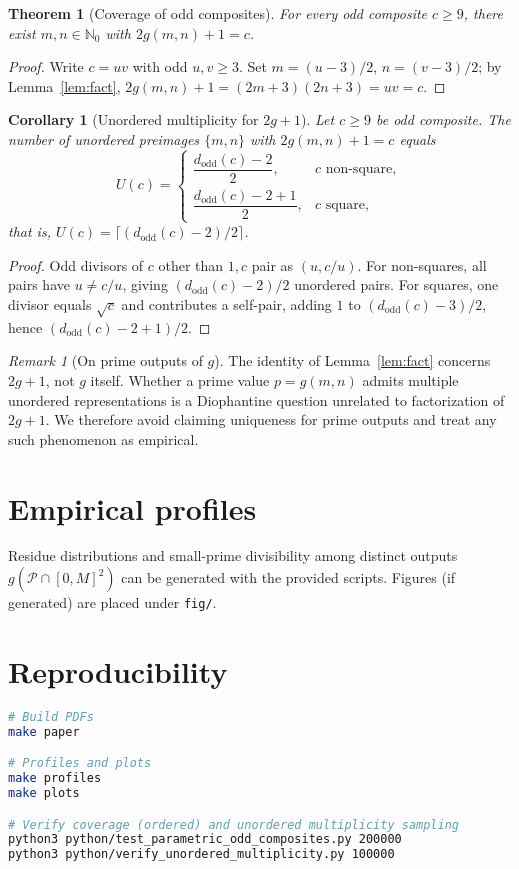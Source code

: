 \documentclass[12pt]{article}
\theoremstyle{definition}
\theoremstyle{plain}
\newtheorem{theorem}[definition]{Theorem}
\newtheorem{corollary}[definition]{Corollary}
\theoremstyle{remark}
\newtheorem{remark}[definition]{Remark}
\begin{document}
\begin{theorem}[Coverage of odd composites]\label{thm:coverage}
For every odd composite \(c\ge 9\), there exist \(m,n\in\mathbb{N}_0\) with \(2g(m,n)+1=c\).
\end{theorem}
\begin{proof}
Write \(c=uv\) with odd \(u,v\ge 3\). Set \(m=(u-3)/2\), \(n=(v-3)/2\); by Lemma~\ref{lem:fact}, \(2g(m,n)+1=(2m+3)(2n+3)=uv=c\).
\end{proof}

\begin{corollary}[Unordered multiplicity for \(2g+1\)]\label{cor:mult}
Let \(c\ge 9\) be odd composite. The number of unordered preimages \(\{m,n\}\) with \(2g(m,n)+1=c\) equals
\[
U(c)=\begin{cases}\dfrac{d_{\mathrm{odd}}(c)-2}{2},& c\text{ non-square},\\[6pt]
\dfrac{d_{\mathrm{odd}}(c)-2+1}{2},& c\text{ square},\end{cases}
\]
that is, \(U(c)=\lceil(d_{\mathrm{odd}}(c)-2)/2\rceil\).
\end{corollary}
\begin{proof}
Odd divisors of \(c\) other than \(1,c\) pair as \((u,c/u)\). For non-squares, all pairs have \(u\ne c/u\), giving \((d_{\mathrm{odd}}(c)-2)/2\) unordered pairs. For squares, one divisor equals \(\sqrt{c}\) and contributes a self-pair, adding \(1\) to \((d_{\mathrm{odd}}(c)-3)/2\), hence \((d_{\mathrm{odd}}(c)-2+1)/2\).
\end{proof}

\begin{remark}[On prime outputs of \(g\)]\label{rem:prime}
The identity of Lemma~\ref{lem:fact} concerns \(2g+1\), not \(g\) itself. Whether a prime value \(p=g(m,n)\) admits multiple unordered representations is a Diophantine question unrelated to factorization of \(2g+1\). We therefore avoid claiming uniqueness for prime outputs and treat any such phenomenon as empirical.
\end{remark}

\section{Empirical profiles}
Residue distributions and small-prime divisibility among distinct outputs \(g(\mathcal{P}\cap[0,M]^2)\) can be generated with the provided scripts. Figures (if generated) are placed under \texttt{fig/}.

\section{Reproducibility}
\begin{lstlisting}[language=bash]
# Build PDFs
make paper

# Profiles and plots
make profiles
make plots

# Verify coverage (ordered) and unordered multiplicity sampling
python3 python/test_parametric_odd_composites.py 200000
python3 python/verify_unordered_multiplicity.py 100000
\end{lstlisting}
\end{document}

